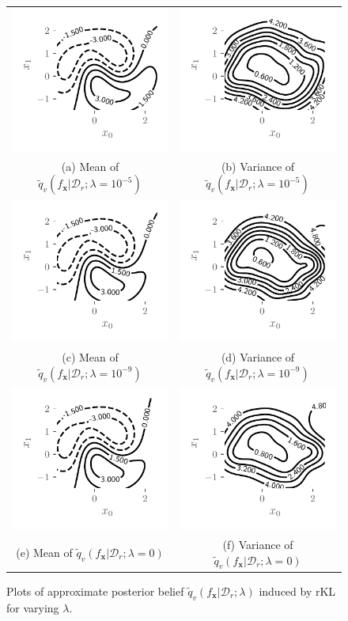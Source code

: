 \documentclass{article}
\theoremstyle{definition}
\newcommand{\mbf}[1]{\mathbf{#1}}
\newcommand{\mcl}[1]{\mathcal{#1}}
\newcommand{\dc}{\mcl{D}_r}
\newcommand{\elbo}{\tilde{q}_v}
\begin{document}
%
\begin{figure}
\centering
\begin{tabular}{cc}
\includegraphics[trim={7mm 8mm 3mm 3mm}, clip,height=0.18\textwidth]{img/moon/moon_elbo_meanf_1e-05.pdf}
&
\includegraphics[trim={7mm 8mm 3mm 3mm}, clip,height=0.18\textwidth]{img/moon/moon_elbo_varf_1e-05.pdf}\\
(a) Mean of $\elbo(f_{\mbf{x}}|\dc; \lambda=10^{-5})$
&
(b) Variance of $\elbo(f_{\mbf{x}}|\dc; \lambda=10^{-5})$\\
\includegraphics[trim={7mm 8mm 3mm 3mm}, clip,height=0.18\textwidth]{img/moon/moon_elbo_meanf_1e-09.pdf}
&
\includegraphics[trim={7mm 8mm 3mm 3mm}, clip,height=0.18\textwidth]{img/moon/moon_elbo_varf_1e-09.pdf}\\
(c) Mean of $\elbo(f_{\mbf{x}}|\dc; \lambda=10^{-9})$
&
(d) Variance of $\elbo(f_{\mbf{x}}|\dc; \lambda=10^{-9})$\\
\includegraphics[trim={7mm 8mm 3mm 3mm}, clip,height=0.18\textwidth]{img/moon/moon_elbo_meanf_0_0.pdf}
&
\includegraphics[trim={7mm 8mm 3mm 3mm}, clip,height=0.18\textwidth]{img/moon/moon_elbo_varf_0_0.pdf}\\
(e) Mean of $\elbo(f_{\mbf{x}}|\dc; \lambda=0)$
&
(f) Variance of $\elbo(f_{\mbf{x}}|\dc; \lambda=0)$
\end{tabular}
\caption{Plots of approximate posterior belief  $\elbo(f_{\mbf{x}}|\dc;\lambda)$
induced by 
rKL for varying $\lambda$.}
\label{fig:moonfullpostelbo}
\end{figure}
\end{document}
